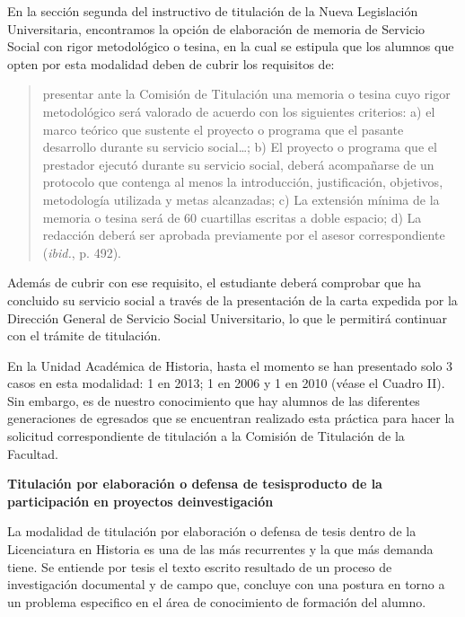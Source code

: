 En la sección segunda del instructivo de titulación de la Nueva Legislación
Universitaria, encontramos la opción de elaboración de memoria de Servicio
Social con rigor metodológico o tesina, en la cual se estipula que los
alumnos que opten por esta modalidad deben de cubrir los requisitos de:

\begin{quotation}
presentar ante la Comisión de Titulación una memoria o tesina cuyo rigor
metodológico será valorado de acuerdo con los siguientes criterios: a) el
marco teórico que sustente el proyecto o programa que el pasante desarrollo
durante su servicio social\ldots; b) El proyecto o programa que el prestador
ejecutó durante su servicio social, deberá acompañarse de un protocolo que
contenga al menos la introducción, justificación, objetivos, metodología
utilizada y metas alcanzadas; c) La extensión mínima de la memoria o tesina
será de 60 cuartillas escritas a doble espacio; d) La redacción deberá ser
aprobada previamente por el asesor correspondiente (\textit{ibid.}, p.
492).
\end{quotation}

Además de cubrir con ese requisito, el estudiante deberá comprobar que ha
concluido su servicio social a través de la presentación de la carta
expedida por la Dirección General de Servicio Social Universitario, lo que
le permitirá continuar con el trámite de titulación. 

En la Unidad Académica de Historia, hasta el momento se han presentado solo
3 casos en esta modalidad: 1 en 2013; 1 en 2006 y 1 en 2010 (véase el Cuadro II). 
Sin embargo, es de nuestro conocimiento que hay alumnos de las diferentes generaciones de
egresados que se encuentran realizado esta práctica para hacer la solicitud
correspondiente de titulación a la Comisión de Titulación de la Facultad.

\textbf{Titulación por elaboración o defensa de tesis\linebreak producto de la
participación en proyectos de\linebreak investigación}

La modalidad de titulación por elaboración o defensa de tesis dentro de la
Licenciatura en Historia es una de las más recurrentes y la que más demanda
tiene. Se entiende por tesis el texto escrito resultado de un proceso de
investigación documental y de campo que, concluye con una postura en torno
a un problema especifico en el área de conocimiento de formación del
alumno.

